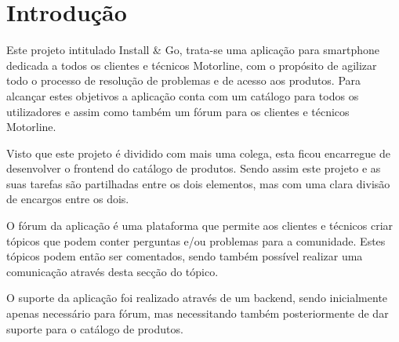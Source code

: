 
\chapter{Introdução}
Este projeto intitulado Install \& Go, trata-se uma aplicação para smartphone dedicada a todos os clientes e 
técnicos Motorline, com o propósito de agilizar todo o processo de resolução de problemas e de acesso 
aos produtos. Para alcançar estes objetivos a aplicação conta com um catálogo para todos os utilizadores 
e assim como também um fórum para os clientes e técnicos Motorline.


Visto que este projeto é dividido com mais uma colega, esta ficou encarregue de desenvolver 
o frontend do catálogo de produtos. Sendo assim este projeto e as suas tarefas são partilhadas entre os dois elementos, 
mas com uma clara divisão de encargos entre os dois.


O fórum da aplicação é uma plataforma que permite aos clientes e técnicos criar tópicos que podem conter 
perguntas e/ou problemas para a comunidade. Estes tópicos podem então 
ser comentados, sendo também possível realizar uma comunicação através desta secção do tópico.

O suporte da aplicação foi realizado através de um backend, sendo inicialmente apenas 
necessário para fórum, mas necessitando também posteriormente de dar suporte para o catálogo de produtos.





